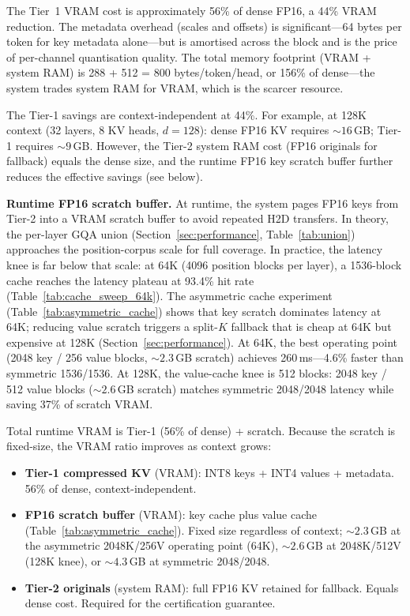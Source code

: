 \documentclass[11pt,a4paper]{article}
\theoremstyle{definition}
\theoremstyle{remark}
\begin{document}
The Tier~1 VRAM cost is approximately 56\% of dense FP16, a 44\% VRAM reduction.  The metadata overhead (scales and offsets) is significant---64 bytes per token for key metadata alone---but is amortised across the block and is the price of per-channel quantisation quality.  The total memory footprint (VRAM + system RAM) is 288 + 512 = 800 bytes/token/head, or 156\% of dense---the system trades system RAM for VRAM, which is the scarcer resource.

The Tier-1 savings are context-independent at 44\%.  For example, at 128K context (32 layers, 8 KV heads, $d{=}128$): dense FP16 KV requires ${\sim}16$\,GB; Tier-1 requires ${\sim}9$\,GB.  However, the Tier-2 system RAM cost (FP16 originals for fallback) equals the dense size, and the runtime FP16 key scratch buffer further reduces the effective savings (see below).

\textbf{Runtime FP16 scratch buffer.}  At runtime, the system pages FP16 keys from Tier-2 into a VRAM scratch buffer to avoid repeated H2D transfers.  In theory, the per-layer GQA union (Section~\ref{sec:performance}, Table~\ref{tab:union}) approaches the position-corpus scale for full coverage.  In practice, the latency knee is far below that scale: at 64K (4096 position blocks per layer), a 1536-block cache reaches the latency plateau at 93.4\% hit rate (Table~\ref{tab:cache_sweep_64k}).  The asymmetric cache experiment (Table~\ref{tab:asymmetric_cache}) shows that key scratch dominates latency at 64K; reducing value scratch triggers a split-$K$ fallback that is cheap at 64K but expensive at 128K (Section~\ref{sec:performance}).  At 64K, the best operating point (2048 key / 256 value blocks, ${\sim}2.3$\,GB scratch) achieves 260\,ms---4.6\% faster than symmetric 1536/1536.  At 128K, the value-cache knee is 512 blocks: 2048 key / 512 value blocks (${\sim}2.6$\,GB scratch) matches symmetric 2048/2048 latency while saving 37\% of scratch VRAM.

Total runtime VRAM is Tier-1 (56\% of dense) + scratch.  Because the scratch is fixed-size, the VRAM ratio improves as context grows:

\begin{itemize}[leftmargin=*,itemsep=2pt]
\item \textbf{Tier-1 compressed KV} (VRAM): INT8 keys + INT4 values + metadata.  56\% of dense, context-independent.
\item \textbf{FP16 scratch buffer} (VRAM): key cache plus value cache (Table~\ref{tab:asymmetric_cache}).  Fixed size regardless of context; ${\sim}2.3$\,GB at the asymmetric 2048K/256V operating point (64K), ${\sim}2.6$\,GB at 2048K/512V (128K knee), or ${\sim}4.3$\,GB at symmetric 2048/2048.
\item \textbf{Tier-2 originals} (system RAM): full FP16 KV retained for fallback.  Equals dense cost.  Required for the certification guarantee.
\end{itemize}
\end{document}
